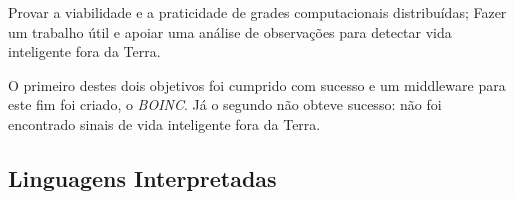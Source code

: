 \documentclass[a4paper,12pt,titlepage]{article}
\begin{document}
\begin{itemize}
  \itemize Provar a viabilidade e a praticidade de grades computacionais distribuídas;
  \itemize Fazer um trabalho útil e apoiar uma análise de observações para detectar vida inteligente fora da Terra.
\end{itemize}

O primeiro destes dois objetivos foi cumprido com sucesso e um middleware para este fim foi criado, o \textit{BOINC}. Já
o segundo não obteve sucesso: não foi encontrado sinais de vida inteligente fora da Terra. 


\subsection{Linguagens Interpretadas}
\end{document}
